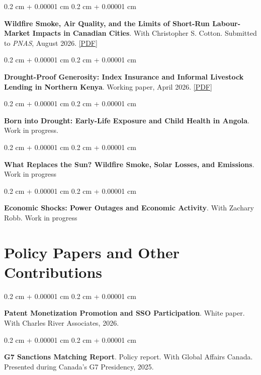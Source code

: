 \documentclass[10pt, letterpaper]{article}
\newenvironment{onecolentry}{
    \begin{adjustwidth}{
        0.2 cm + 0.00001 cm
    }{
        0.2 cm + 0.00001 cm
    }
}{
    \end{adjustwidth}
} %
\let\hrefWithoutArrow\href
\renewcommand{\href}[2]{\hrefWithoutArrow{#1}{\ifthenelse{\equal{#2}{}}{ }{#2 }\raisebox{.15ex}{\footnotesize \faExternalLink*}}}
\begin{document}
\begin{onecolentry}
    \textbf{Wildfire Smoke, Air Quality, and the Limits of Short-Run Labour-Market Impacts in Canadian Cities}.
    With Christopher S. Cotton. Submitted to \textit{PNAS}, August 2026.
    \hrefWithoutArrow{https://zemarhakim.github.io/wildfire.pdf}{[PDF]}
\end{onecolentry}
\vspace{0.25cm}

\begin{onecolentry}
    \textbf{Drought-Proof Generosity: Index Insurance and Informal Livestock Lending in Northern Kenya}.
    Working paper, April 2026.
    \hrefWithoutArrow{https://zemarhakim.github.io/ibli_kenya.pdf}{[PDF]}
\end{onecolentry}
\vspace{0.25cm}

\begin{onecolentry}
    \textbf{Born into Drought: Early-Life Exposure and Child Health in Angola}. Work in progress.
\end{onecolentry}
\vspace{0.25cm}

\begin{onecolentry}
    \textbf{What Replaces the Sun? Wildfire Smoke, Solar Losses, and Emissions}. Work in progress
\end{onecolentry}
\vspace{0.25cm}
\begin{onecolentry}
    \textbf{Economic Shocks: Power Outages and Economic Activity}. With Zachary Robb. Work in progress
\end{onecolentry}



\vspace{0.05cm}
\section{Policy Papers and Other Contributions}
\vspace{0.2cm}

\begin{onecolentry}
    \textbf{Patent Monetization Promotion and SSO Participation}. White paper.
    With Charles River Associates, 2026.
\end{onecolentry}
\vspace{0.05cm}

\vspace{0.2cm}

\begin{onecolentry}
    \textbf{G7 Sanctions Matching Report}. Policy report.
    With Global Affairs Canada. Presented during Canada's G7 Presidency, 2025.
\end{onecolentry}
\vspace{0.05cm}
\end{document}
